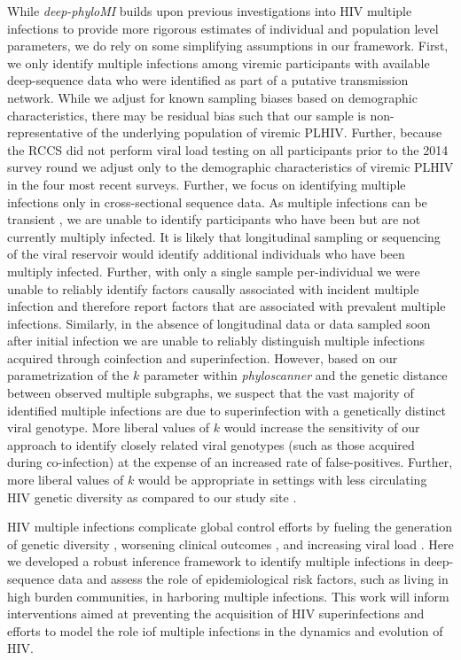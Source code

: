 \documentclass[10pt,letterpaper]{article}
\begin{document}
While \textit{deep-phyloMI} builds upon previous investigations into HIV multiple infections to provide more rigorous estimates of individual and population level parameters, we do rely on some simplifying assumptions in our framework. First, we only identify multiple infections among viremic participants with available deep-sequence data who were identified as part of a putative transmission network. While we adjust for known sampling biases based on demographic characteristics, there may be residual bias such that our sample is non-representative of the underlying population of viremic PLHIV. Further, because the RCCS did not perform viral load testing on all participants prior to the 2014 survey round we adjust only to the demographic characteristics of viremic PLHIV in the four most recent surveys. Further, we focus on identifying multiple infections only in cross-sectional sequence data. As multiple infections can be transient \cite{ronen2013}, we are unable to identify participants who have been but are not currently multiply infected. It is likely that longitudinal sampling or sequencing of the viral reservoir would identify additional individuals who have been multiply infected. Further, with only a single sample per-individual we were unable to reliably identify factors causally associated with incident multiple infection \cite{savitz2022} and therefore report factors that are associated with prevalent multiple infections. Similarly, in the absence of longitudinal data or data sampled soon after initial infection we are unable to reliably distinguish multiple infections acquired through coinfection and superinfection. However, based on our parametrization of the $k$ parameter within \textit{phyloscanner} and the genetic distance between observed multiple subgraphs, we suspect that the vast majority of identified multiple infections are due to superinfection with a genetically distinct viral genotype. More liberal values of $k$ would increase the sensitivity of our approach to identify closely related viral genotypes (such as those acquired during co-infection) at the expense of an increased rate of false-positives. Further, more liberal values of $k$ would be appropriate in settings with less circulating HIV genetic diversity as compared to our study site \cite{kim2024}. \par

HIV multiple infections complicate global control efforts by fueling the generation of genetic diversity \cite{ramirez2008}, worsening clinical outcomes \cite{gottlieb2004, smith2004}, and increasing viral load \cite{smith2004, ronen2013, janes2015}. Here we developed a robust inference framework to identify multiple infections in deep-sequence data and assess the role of epidemiological risk factors, such as living in high burden communities, in harboring multiple infections. This work will inform interventions aimed at preventing the acquisition of HIV superinfections and efforts to model the role iof multiple infections in the dynamics and evolution of HIV. 
\end{document}
